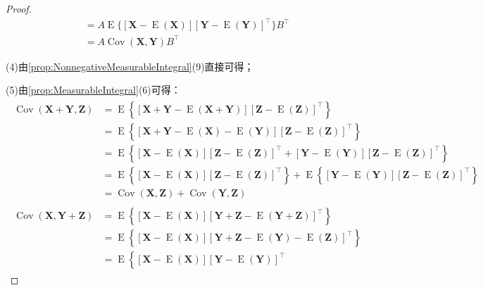 \begin{proof}
\begin{align*}
		&=A\operatorname{E}\{[\mathbf{X}-\operatorname{E}(\mathbf{X})][\mathbf{Y}-\operatorname{E}(\mathbf{Y})]^{\top}\}B^{\top} \\
		&=A\operatorname{Cov}(\mathbf{X},\mathbf{Y})B^{\top}
	\end{align*}\par
	(4)由\cref{prop:NonnegativeMeasurableIntegral}(9)直接可得；\par
	(5)由\cref{prop:MeasurableIntegral}(6)可得：
	\begin{gather*}
		\begin{aligned}
			\operatorname{Cov}(\mathbf{X}+\mathbf{Y},\mathbf{Z})
			&=\operatorname{E}\left\{\left[\mathbf{X}+\mathbf{Y}-\operatorname{E}(\mathbf{X}+\mathbf{Y})\right]\left[\mathbf{Z}-\operatorname{E}(\mathbf{Z})\right]^{\top}\right\} \\
			&=\operatorname{E}\left\{\left[\mathbf{X}+\mathbf{Y}-\operatorname{E}(\mathbf{X})-\operatorname{E}(\mathbf{Y})\right]\left[\mathbf{Z}-\operatorname{E}(\mathbf{Z})\right]^{\top}\right\} \\
			&=\operatorname{E}\left\{\left[\mathbf{X}-\operatorname{E}(\mathbf{X})\right]\left[\mathbf{Z}-\operatorname{E}(\mathbf{Z})\right]^{\top}
			+\left[\mathbf{Y}-\operatorname{E}(\mathbf{Y})\right]\left[\mathbf{Z}-\operatorname{E}(\mathbf{Z})\right]^{\top}\right\} \\
			&=\operatorname{E}\left\{\left[\mathbf{X}-\operatorname{E}(\mathbf{X})\right]\left[\mathbf{Z}-\operatorname{E}(\mathbf{Z})\right]^{\top}\right\}
			+\operatorname{E}\left\{\left[\mathbf{Y}-\operatorname{E}(\mathbf{Y})\right]\left[\mathbf{Z}-\operatorname{E}(\mathbf{Z})\right]^{\top}\right\} \\
			&=\operatorname{Cov}(\mathbf{X},\mathbf{Z})+\operatorname{Cov}(\mathbf{Y},\mathbf{Z})
		\end{aligned} \\
		\begin{aligned}
			\operatorname{Cov}(\mathbf{X},\mathbf{Y}+\mathbf{Z})
			&=\operatorname{E}\left\{\left[\mathbf{X}-\operatorname{E}(\mathbf{X})\right]\left[\mathbf{Y}+\mathbf{Z}-\operatorname{E}(\mathbf{Y}+\mathbf{Z})\right]^{\top}\right\} \\
			&=\operatorname{E}\left\{\left[\mathbf{X}-\operatorname{E}(\mathbf{X})\right]\left[\mathbf{Y}+\mathbf{Z}-\operatorname{E}(\mathbf{Y})-\operatorname{E}(\mathbf{Z})\right]^{\top}\right\} \\
			&=\operatorname{E}\left\{\left[\mathbf{X}-\operatorname{E}(\mathbf{X})\right]\left[\mathbf{Y}-\operatorname{E}(\mathbf{Y})\right]^{\top}

\end{aligned}
\end{gather*}
\end{proof}
